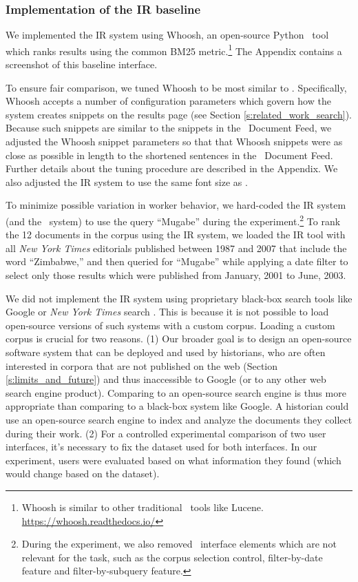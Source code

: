\subsubsection{Implementation of the IR baseline}
We implemented the IR system using Whoosh, an open-source Python \Baselongname~tool which ranks results using the common BM25 metric.\footnote{Whoosh is similar to other traditional \Baselongname~tools like Lucene. \url{https://whoosh.readthedocs.io/}} The Appendix contains a screenshot of this baseline interface.

To ensure fair comparison, we tuned Whoosh to be most similar to \ours.
Specifically, Whoosh accepts a number of configuration parameters which govern how the system creates snippets on the results page (see Section \ref{s:related_work_search}). 
Because such snippets are similar to the snippets in the \ours~Document Feed, we adjusted the Whoosh snippet parameters so that that Whoosh snippets were as close as possible in length to the shortened sentences in the \ours~Document Feed.
Further details about the tuning procedure are described in the Appendix.
We also adjusted the IR system to use the same font size as \ours.

To minimize possible variation in worker behavior, we hard-coded the IR system (and the \ours~system) to use the query ``Mugabe'' during the experiment.\footnote{During the experiment, we also removed \ours~interface elements which are not relevant for the task, such as the corpus selection control, filter-by-date feature and filter-by-subquery feature.}
To rank the 12 documents in the corpus using the IR system, we loaded the IR tool with all \textit{New York Times} editorials published between 1987 and 2007 that include the word ``Zimbabwe,'' and then queried for ``Mugabe'' while applying a date filter to select only those results which were published from January, 2001 to June, 2003.

We did not implement the IR system using proprietary black-box search tools like Google or \textit{New York Times} search \cite{nytwebsite}.
This is because it is not possible to load open-source versions of such systems with a custom corpus.
Loading a custom corpus is crucial for two reasons. 
(1) Our broader goal is to design an open-source software system that can be deployed and used by historians, who are often interested in corpora that are not published on the web (Section \ref{s:limits_and_future}) and thus inaccessible to Google (or to any other web search engine product).
Comparing to an open-source search engine is thus more appropriate than comparing to a black-box system like Google. 
A historian could use an open-source search engine to index and analyze the documents they collect during their work.
(2) For a controlled experimental comparison of two user interfaces, it's necessary to fix the dataset used for both interfaces. 
In our experiment, users were evaluated based on what information they found (which would change based on the dataset).

